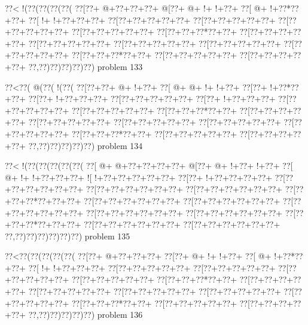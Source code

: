 \vbox{\vbox{\goo
\0??<\- !(\0??(\0??(\0??(\0??(
\0??[\0??+\- @+\0??+\0??+\0??+
\- @[\0??+\- @+\- !+\- !+\0??+
\0??[\- @+\- !+\0??*\0??+\0??+
\0??[\- !+\- !+\0??+\0??+\0??+
\0??[\0??+\0??+\0??+\0??+\0??+
\0??[\0??+\0??+\0??+\0??+\0??+
\0??[\0??+\0??+\0??+\0??+\0??+
\0??[\0??+\0??+\0??+\0??+\0??+
\0??[\0??+\0??+\0??*\0??+\0??+
\0??[\0??+\0??+\0??+\0??+\0??+
\0??[\0??+\0??+\0??+\0??+\0??+
\0??[\0??+\0??+\0??+\0??+\0??+
\0??[\0??+\0??+\0??+\0??+\0??+
\0??[\0??+\0??+\0??+\0??+\0??+
\0??[\0??+\0??+\0??*\0??+\0??+
\0??[\0??+\0??+\0??+\0??+\0??+
\0??[\0??+\0??+\0??+\0??+\0??+
\0??,\0??)\0??)\0??)\0??)\0??)
}
\hfil problem 133\hfil\break
}

\vbox{\vbox{\goo
\0??<\0??(\- @(\0??(\- !(\0??(
\0??[\0??+\0??+\- @+\- !+\0??+
\0??[\- @+\- @+\- !+\- !+\0??+
\0??[\0??+\- !+\0??*\0??+\0??+
\0??[\0??+\- !+\0??+\0??+\0??+
\0??[\0??+\0??+\0??+\0??+\0??+
\0??[\0??+\- !+\0??+\0??+\0??+
\0??[\0??+\0??+\0??+\0??+\0??+
\0??[\0??+\0??+\0??+\0??+\0??+
\0??[\0??+\0??+\0??*\0??+\0??+
\0??[\0??+\0??+\0??+\0??+\0??+
\0??[\0??+\0??+\0??+\0??+\0??+
\0??[\0??+\0??+\0??+\0??+\0??+
\0??[\0??+\0??+\0??+\0??+\0??+
\0??[\0??+\0??+\0??+\0??+\0??+
\0??[\0??+\0??+\0??*\0??+\0??+
\0??[\0??+\0??+\0??+\0??+\0??+
\0??[\0??+\0??+\0??+\0??+\0??+
\0??,\0??)\0??)\0??)\0??)\0??)
}
\hfil problem 134\hfil\break
}

\vbox{\vbox{\goo
\0??<\- !(\0??(\0??(\0??(\0??(\0??(
\0??[\- @+\- @+\0??+\0??+\0??+\0??+
\- @[\0??+\- @+\- !+\0??+\- !+\0??+
\0??[\- @+\- !+\- !+\0??+\0??+\0??+
\- ![\- !+\0??+\0??+\0??+\0??+\0??+
\0??[\0??+\- !+\0??+\0??+\0??+\0??+
\0??[\0??+\0??+\0??+\0??+\0??+\0??+
\0??[\0??+\0??+\0??+\0??+\0??+\0??+
\0??[\0??+\0??+\0??+\0??+\0??+\0??+
\0??[\0??+\0??+\0??*\0??+\0??+\0??+
\0??[\0??+\0??+\0??+\0??+\0??+\0??+
\0??[\0??+\0??+\0??+\0??+\0??+\0??+
\0??[\0??+\0??+\0??+\0??+\0??+\0??+
\0??[\0??+\0??+\0??+\0??+\0??+\0??+
\0??[\0??+\0??+\0??+\0??+\0??+\0??+
\0??[\0??+\0??+\0??*\0??+\0??+\0??+
\0??[\0??+\0??+\0??+\0??+\0??+\0??+
\0??[\0??+\0??+\0??+\0??+\0??+\0??+
\0??,\0??)\0??)\0??)\0??)\0??)\0??)
}
\hfil problem 135\hfil\break
}

\vbox{\vbox{\goo
\0??<\0??(\0??(\0??(\0??(\0??(
\0??[\0??+\- @+\0??+\0??+\0??+
\0??[\0??+\- @+\- !+\- !+\0??+
\0??[\- @+\- !+\0??*\0??+\0??+
\0??[\- !+\- !+\0??+\0??+\0??+
\0??[\0??+\0??+\0??+\0??+\0??+
\0??[\0??+\0??+\0??+\0??+\0??+
\0??[\0??+\0??+\0??+\0??+\0??+
\0??[\0??+\0??+\0??+\0??+\0??+
\0??[\0??+\0??+\0??*\0??+\0??+
\0??[\0??+\0??+\0??+\0??+\0??+
\0??[\0??+\0??+\0??+\0??+\0??+
\0??[\0??+\0??+\0??+\0??+\0??+
\0??[\0??+\0??+\0??+\0??+\0??+
\0??[\0??+\0??+\0??+\0??+\0??+
\0??[\0??+\0??+\0??*\0??+\0??+
\0??[\0??+\0??+\0??+\0??+\0??+
\0??[\0??+\0??+\0??+\0??+\0??+
\0??,\0??)\0??)\0??)\0??)\0??)
}
\hfil problem 136\hfil\break
}

